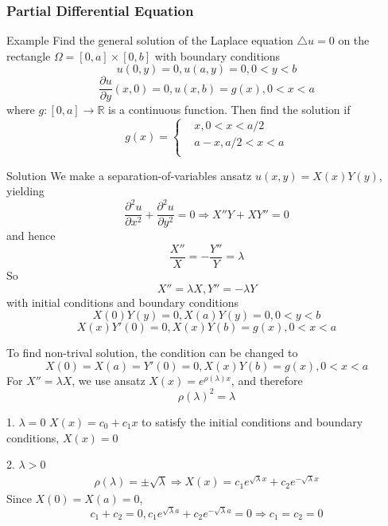 \documentclass{beamer}
\begin{document}
\begin{frame}


\frametitle{Partial Differential Equation}

\begin{block}{Example}
Find the general solution of the Laplace equation $\triangle u = 0$ on the rectangle $\Omega = [0,a] \times [0,b]$ with boundary conditions
$$u(0, y) = 0, u(a,y) = 0, 0 < y < b$$
$$\dfrac{\partial u}{\partial y}(x,0) = 0, u(x, b) = g(x), 0 < x < a$$
where $g : [0, a] \rightarrow \mathbb{R}$ is a continuous function. Then find the solution if
$$g(x) =\left\{
\begin{aligned}
&x,0<x<a/2\\
&a-x,a/2<x<a\\
\end{aligned}
\right.
$$
\end{block}
\end{frame}
\begin{frame}
\begin{block}{Solution}
We make a separation-of-variables ansatz $u(x, y) = X(x)Y (y)$, yielding
$$\dfrac{\partial^2 u}{\partial x^2}+\dfrac{\partial^2 u}{\partial y^2}=0\Rightarrow X''Y+XY''=0$$
and hence
$$\dfrac{X''}{X}=-\dfrac{Y''}{Y}=\lambda$$
So
$$X''=\lambda X, Y''=-\lambda Y $$
with initial conditions and boundary conditions
$$X(0)Y(y)=0,X(a)Y(y)=0, 0<y<b$$
$$X(x)Y'(0)=0,X(x)Y(b)=g(x),0<x<a$$
\end{block}
\end{frame}
\begin{frame}
To find non-trival solution, the condition can be changed to
$$X(0)=X(a)=Y'(0)=0,X(x)Y(b)=g(x),0<x<a$$
For $X''=\lambda X$, we use ansatz $X(x)=e^{\rho(\lambda)x}$, and therefore
$$\rho(\lambda)^2=\lambda$$
\begin{block}{1. $\lambda=0$}
$X(x)=c_0+c_1x$ to satisfy the initial conditions and boundary conditions, $X(x)=0$
\end{block}
\end{frame}
\begin{frame}
\begin{block}{2. $\lambda>0$}
\begin{align*}
\rho(\lambda)=\pm\sqrt{\lambda}\Rightarrow X(x)=c_1e^{\sqrt{\lambda}x}+c_2e^{-\sqrt{\lambda}x}
\end{align*}
Since $X(0)=X(a)=0$, 
$$c_1+c_2=0,c_1e^{\sqrt{\lambda}a}+c_2e^{-\sqrt{\lambda}a}=0\Rightarrow c_1=c_2=0$$
\end{block}

\end{frame}
\end{document}
